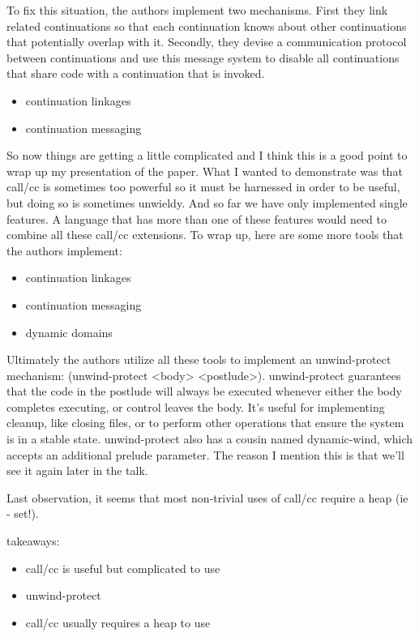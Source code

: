 \documentclass[letterpaper]{llncs}
\begin{document}
To fix this situation, the authors implement two mechanisms. First they link related continuations so that each continuation knows about other continuations that potentially overlap with it. Secondly, they devise a communication protocol between continuations and use this message system to disable all continuations that share code with a continuation that is invoked.

\begin{itemize}
	\item continuation linkages
	\item continuation messaging
\end{itemize}

So now things are getting a little complicated and I think this is a good point to wrap up my presentation of the paper. What I wanted to demonstrate was that call/cc is sometimes too powerful so it must be harnessed in order to be useful, but doing so is sometimes unwieldy. And so far we have only implemented single features. A language that has more than one of these features would need to combine all these call/cc extensions. To wrap up, here are some more tools that the authors implement:

\begin{itemize}
	\item continuation linkages
	\item continuation messaging
	\item dynamic domains
\end{itemize}

Ultimately the authors utilize all these tools to implement an unwind-protect mechanism: (unwind-protect <body> <postlude>). unwind-protect guarantees that the code in the postlude will always be executed whenever either the body completes executing, or control leaves the body. It's useful for implementing cleanup, like closing files, or to perform other operations that ensure the system is in a stable state. unwind-protect also has a cousin named dynamic-wind, which accepts an additional prelude parameter. The reason I mention this is that we'll see it again later in the talk.

Last observation, it seems that most non-trivial uses of call/cc require a heap (ie - set!).

takeaways:
\begin{itemize}
	\item call/cc is useful but complicated to use
	\item unwind-protect
	\item call/cc usually requires a heap to use
\end{itemize}
\end{document}
